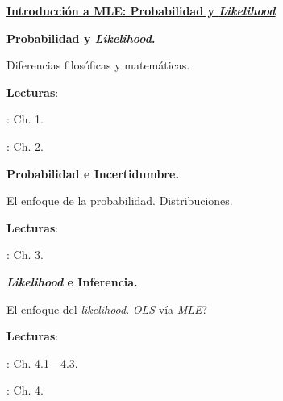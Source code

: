 \documentclass[letterpaper]{article}
\renewenvironment{itemize}{
  \begin{list}{}{
    \setlength{\leftmargin}{1.5em}
  }
}{
  \end{list}
}
\begin{document}
\begin{enumerate}[label=\roman*.]
	\item {\bf {\color{ForestGreen}\underline{Introducci\'on a MLE: Probabilidad y \emph{Likelihood}}}}


      \begin{itemize} 
        \item[7.] {\bf Probabilidad y \emph{Likelihood}.}
        \begin{itemize} 
          \item[$\circ$] Diferencias filos\'oficas y matem\'aticas.
          \item[$\circ$] {\bf Lecturas}: 
            \begin{itemize} 
              \item[$\diamond$] \textcite{Ward2018}: Ch. 1.
              \item[$\diamond$] \textcite{King1998}: Ch. 2.
            \end{itemize}
        \end{itemize}
      \end{itemize}


      \begin{itemize} 
        \item[8.] {\bf Probabilidad e Incertidumbre.}
        \begin{itemize} 
          \item[$\circ$] El enfoque de la probabilidad. Distribuciones. 
          \item[$\circ$] {\bf Lecturas}: 
            \begin{itemize} 
              \item[$\diamond$] \textcite{King1998}: Ch. 3.
            \end{itemize}
        \end{itemize}
      \end{itemize}


      \begin{itemize} 
        \item[9.] {\bf \emph{Likelihood} e Inferencia.}
        \begin{itemize} 
          \item[$\circ$] El enfoque del \emph{likelihood}. \emph{OLS} v\'ia \emph{MLE}?
          \item[$\circ$] {\bf Lecturas}: 
            \begin{itemize} 
              \item[$\diamond$] \textcite{King1998}: Ch. 4.1---4.3. 
              \item[$\diamond$] \textcite{Ward2018}: Ch. 4.
            \end{itemize}
        \end{itemize}
      \end{itemize}



\end{enumerate}
\end{document}
